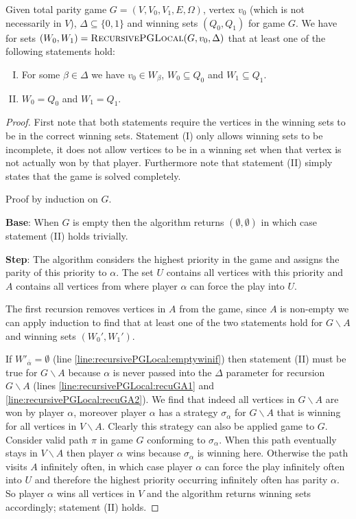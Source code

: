 \begin{theorem}
	\label{the_local_zlnk_correct}
	Given total parity game $G = (V,V_0,V_1,E,\Omega)$, vertex $v_0$ (which is not necessarily in $V$), $\Delta \subseteq \{0,1\}$ and winning sets $(Q_0,Q_1)$ for game $G$. We have for sets $(W_0,W_1) = \textsc{RecursivePGLocal}(G,v_0,\Delta)$ that at least one of the following statements hold:
	\begin{enumerate}[(I)]
		\item For some $\beta \in \Delta$ we have $v_0 \in W_\beta$, $W_0 \subseteq Q_0$ and $W_1 \subseteq Q_1$.
		\item $W_0 = Q_0$ and $W_1 = Q_1$.
	\end{enumerate}
		\begin{proof}
			First note that both statements require the vertices in the winning sets to be in the correct winning sets. Statement (I) only allows winning sets to be incomplete, it does not allow vertices to be in a winning set when that vertex is not actually won by that player. Furthermore note that statement (II) simply states that the game is solved completely.
			
			Proof by induction on $G$. 
			
			\textbf{Base}: When $G$ is empty then the algorithm returns $(\emptyset, \emptyset)$ in which case statement (II) holds trivially.
			
			\textbf{Step}: The algorithm considers the highest priority in the game and assigns the parity of this priority to $\alpha$. The set $U$ contains all vertices with this priority and $A$ contains all vertices from where player $\alpha$ can force the play into $U$.
			
			The first recursion removes vertices in $A$ from the game, since $A$ is non-empty we can apply induction to find that at least one of the two statements hold for $G\backslash A$ and winning sets $(W_0',W_1')$.
			
			If $W'_{\overline{\alpha}} = \emptyset$ (line \ref{line:recursivePGLocal:emptywinif}) then statement (II) must be true for $G \backslash A$ because $\alpha$ is never passed into the $\Delta$ parameter for recursion $G \backslash A$ (lines \ref{line:recursivePGLocal:recuGA1} and \ref{line:recursivePGLocal:recuGA2}). We find that indeed all vertices in $G\backslash A$ are won by player $\alpha$, moreover player $\alpha$ has a strategy $\sigma_\alpha$ for $G\backslash A$ that is winning for all vertices in $V\backslash A$. Clearly this strategy can also be applied game to $G$. Consider valid path $\pi$ in game $G$ conforming to $\sigma_\alpha$. When this path eventually stays in $V \backslash A$ then player $\alpha$ wins because $\sigma_\alpha$ is winning here. Otherwise the path visits $A$ infinitely often, in which case player $\alpha$ can force the play infinitely often into $U$ and therefore the highest priority occurring infinitely often has parity $\alpha$. So player $\alpha$ wins all vertices in $V$ and the algorithm returns winning sets accordingly; statement (II) holds.
			

\end{proof}
\end{theorem}
